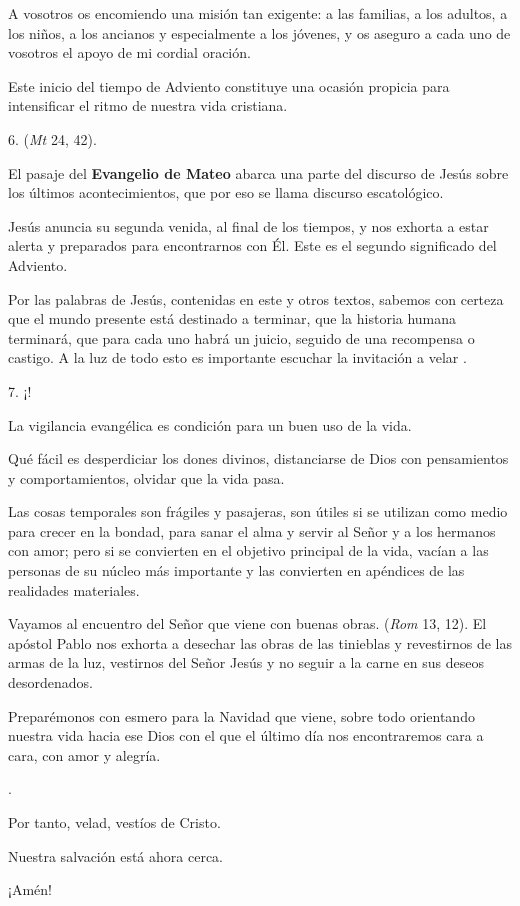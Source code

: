 \begin{body}
	A vosotros os encomiendo una misión tan exigente: a las familias, a los adultos, a los niños, a los ancianos y especialmente a los jóvenes, y os aseguro a cada uno de vosotros el apoyo de mi cordial oración. 
	
	Este inicio del tiempo de Adviento constituye una ocasión propicia para intensificar el ritmo de nuestra vida cristiana. 
	
	6.  (\emph{Mt} 24, 42). 
	
	El pasaje del \textbf{Evangelio de Mateo} abarca una parte del discurso de Jesús sobre los últimos acontecimientos, que por eso se llama discurso escatológico. 
	
	Jesús anuncia su segunda venida, al final de los tiempos, y nos exhorta a estar alerta y preparados para encontrarnos con Él. Este es el segundo significado del Adviento. 
	
	Por las palabras de Jesús, contenidas en este y otros textos, sabemos con certeza que el mundo presente está destinado a terminar, que la historia humana terminará, que para cada uno habrá un juicio, seguido de una recompensa o castigo. A la luz de todo esto es importante escuchar la invitación a velar . 
	
	7. ¡! 
	
	La vigilancia evangélica es condición para un buen uso de la vida. 
	
	Qué fácil es desperdiciar los dones divinos, distanciarse de Dios con pensamientos y comportamientos, olvidar que la vida pasa. 
	
	Las cosas temporales son frágiles y pasajeras, son útiles si se utilizan como medio para crecer en la bondad, para sanar el alma y servir al Señor y a los hermanos con amor; pero si se convierten en el objetivo principal de la vida, vacían a las personas de su núcleo más importante y las convierten en apéndices de las realidades materiales. 
	
	Vayamos al encuentro del Señor que viene con buenas obras.  (\emph{Rom} 13, 12). El apóstol Pablo nos exhorta a desechar las obras de las tinieblas y revestirnos de las armas de la luz, vestirnos del Señor Jesús y no seguir a la carne en sus deseos desordenados. 
	
	Preparémonos con esmero para la Navidad que viene, sobre todo orientando nuestra vida hacia ese Dios con el que el último día nos encontraremos cara a cara, con amor y alegría. 
	
	. 
	
	Por tanto, velad, vestíos de Cristo. 
	
	Nuestra salvación está ahora cerca. 
	
	¡Amén!
\end{body}

